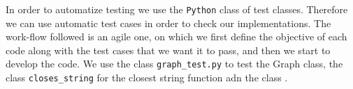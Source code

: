 In order to automatize testing we use the \texttt{Python} class of test classes. Therefore we can use automatic test cases in order to check our implementations. The work-flow followed is an agile one, on which we first define the objective of each code along with the test cases that we want it to pass, and then we start to develop the code. 
We use the class \texttt{graph\_test.py} to test the Graph class, the class \texttt{closes_string} for the closest string function adn the class . \\

